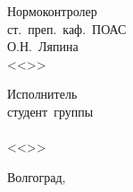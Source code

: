 {{\begin{flushleft}
\begin{minipage}[c]{15em}
Нормоконтролер\\
ст.\ преп.\ каф.\ ПОАС\\
\makebox[2cm]{\hrulefill}О.Н.~Ляпина\\
<<\makebox[1.5cm]{\hrulefill}>>\makebox[3.5cm]{\hrulefill}\the\year
\end{minipage}
\hfill
\begin{minipage}[c]{15em}
Исполнитель\\
студент\ группы\ \VSTUStudentGroup\\
\makebox[2cm]{\hrulefill}\VSTUStudentName\\
<<\makebox[1.5cm]{\hrulefill}>>\makebox[3.5cm]{\hrulefill}\the\year
\end{minipage}
\end{flushleft}

\vspace{\fill}
\begin{center}
Волгоград,\ \the\year
\end{center}
}
}
